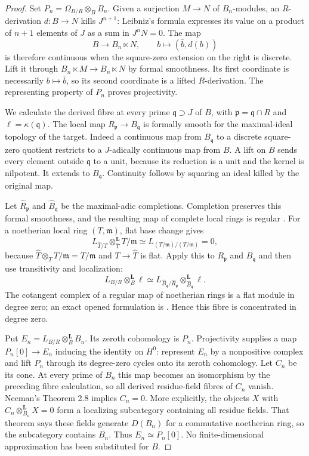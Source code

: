 \begin{proof}
Set $P_n=\Omega_{B/R}\otimes_B B_n$. Given a surjection $M\to N$
of $B_n$-modules, an $R$-derivation $d:B\to N$ kills $J^{n+1}$:
Leibniz's formula expresses its value on a product of $n+1$ elements
of $J$ as a sum in $J^nN=0$. The map
\[
 B\longrightarrow B_n\ltimes N,\qquad b\longmapsto(\bar b,d(b))
\]
is therefore continuous when the square-zero extension on the right
is discrete. Lift it through $B_n\ltimes M\to B_n\ltimes N$ by formal
smoothness. Its first coordinate is necessarily $b\mapsto\bar b$,
so its second coordinate is a lifted $R$-derivation. The representing
property of $P_n$ proves projectivity.

We calculate the derived fibre at every prime $\mathfrak q\supset J$
of $B$, with $\mathfrak p=\mathfrak q\cap R$ and
$\ell=\kappa(\mathfrak q)$. The local map
$R_{\mathfrak p}\to B_{\mathfrak q}$ is formally smooth for the
maximal-ideal topology of the target. Indeed a continuous map from
$B_{\mathfrak q}$ to a discrete square-zero quotient restricts to a
$J$-adically continuous map from $B$. A lift on $B$ sends every
element outside $\mathfrak q$ to a unit, because its reduction is a
unit and the kernel is nilpotent. It extends to $B_{\mathfrak q}$.
Continuity follows by squaring an ideal killed by the original map.

Let $\widehat R_{\mathfrak p}$ and $\widehat B_{\mathfrak q}$ be the
maximal-adic completions. Completion preserves this formal
smoothness, and the resulting map of complete local rings is regular
\cite[Proposition 15.50.2 and its cited completion lemma]{rootStacksAndre}.
For a noetherian local ring $(T,\mathfrak m)$, flat base change gives
\[
 L_{\widehat T/T}\otimes_{\widehat T}^{\mathbf L}T/\mathfrak m
 \simeq L_{(T/\mathfrak m)/(T/\mathfrak m)}=0,
\]
because $\widehat T\otimes_T T/\mathfrak m=T/\mathfrak m$ and
$T\to\widehat T$ is flat. Apply this to $R_{\mathfrak p}$ and
$B_{\mathfrak q}$ and then use transitivity and localization:
\[
 L_{B/R}\otimes_B^{\mathbf L}\ell
 \simeq
 L_{\widehat B_{\mathfrak q}/\widehat R_{\mathfrak p}}
       \otimes_{\widehat B_{\mathfrak q}}^{\mathbf L}\ell .
\]
The cotangent complex of a regular map of noetherian rings is a flat
module in degree zero; an exact opened formulation is
\cite[Theorem 2.10]{rootBlickleFink2025}. Hence this fibre is
concentrated in degree zero.

Put $E_n=L_{B/R}\otimes_B^{\mathbf L}B_n$. Its zeroth cohomology
is $P_n$. Projectivity supplies a map $P_n[0]\to E_n$ inducing the
identity on $H^0$: represent $E_n$ by a nonpositive complex and lift
$P_n$ through its degree-zero cycles onto its zeroth cohomology.
Let $C_n$ be its cone. At every prime of $B_n$ this map becomes an
isomorphism by the preceding fibre calculation, so all derived
residue-field fibres of $C_n$ vanish. Neeman's Theorem 2.8
\cite{rootNeeman1992} implies $C_n=0$. More explicitly, the objects
$X$ with $C_n\otimes^{\mathbf L}_{B_n}X=0$ form a localizing
subcategory containing all residue fields. That theorem says these
fields generate $D(B_n)$ for a commutative noetherian ring, so the
subcategory contains $B_n$. Thus $E_n\simeq P_n[0]$. No
finite-dimensional approximation has been substituted for $B$.
\end{proof}

